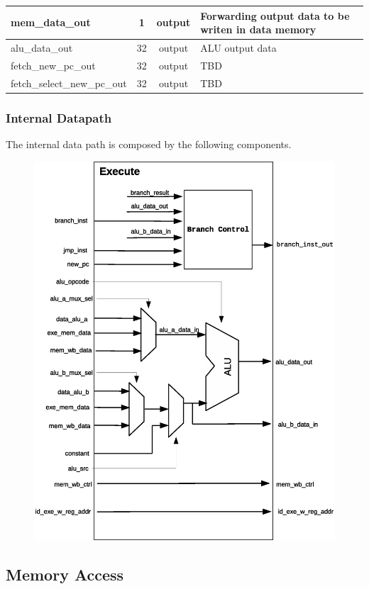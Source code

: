 \documentclass{article}
\begin{document}
\begin{center}
\begin{longtable}[pos]{| l | c | c | m{7cm} |}
        mem\_data\_out          & 1   & output  & Forwarding output data to be writen in data memory \\ \hline
        alu\_data\_out          & 32  & output  & ALU output data \\ \hline
        fetch\_new\_pc\_out     & 32  & output  & TBD \\ \hline
        fetch\_select\_new\_pc\_out  & 32  & output  & TBD \\ \hline
      \end{longtable}
    \end{center} 
     
  \subsubsection{Internal Datapath} 
  The internal data path is composed by the following components.

  \begin{figure}[H]
    \centering
    \includegraphics[width=.8\linewidth]{pictures/datapath/ex_datapath.eps}
  \end{figure}  

  \newpage
  \subsection{Memory Access}
\end{document}
